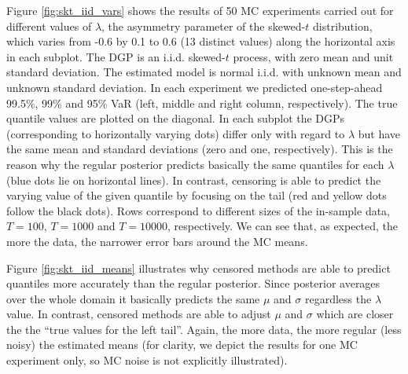 \documentclass[a4paper,10pt]{article} %
\begin{document}
Figure \ref{fig:skt_iid_vars}  shows the results of 50 MC experiments carried out for different values of $\lambda$, the asymmetry parameter of the skewed-$t$ distribution, which varies from -0.6 by 0.1 to 0.6 (13 distinct values) along the horizontal axis in each subplot. The DGP is an i.i.d. skewed-$t$  process, with zero mean and unit standard deviation. The estimated model is normal i.i.d. with unknown mean and unknown standard deviation.
In each experiment we predicted one-step-ahead 99.5\%, 99\% and 95\% VaR (left, middle and right column, respectively).
The true quantile values are plotted on the diagonal. 
In each subplot the DGPs (corresponding to horizontally varying dots) differ  only with regard to $\lambda$ but have the same mean and standard deviations (zero and one, respectively). This is the reason why the regular posterior predicts basically the same quantiles for each $\lambda$ (blue dots lie on horizontal lines). In contrast, censoring is able to predict the varying value of the given quantile by focusing on the tail (red and yellow dots follow the black dots). 
Rows correspond to different sizes of the in-sample data, $T=100$, $T=1000$ and $T=10000$, respectively. 
We can see that, as expected, the more the data, the narrower  error bars around the MC means. 

Figure \ref{fig:skt_iid_means} illustrates why censored methods are able to predict quantiles more accurately than the regular posterior. Since posterior averages over the whole domain it basically predicts the same $\mu$ and $\sigma$ regardless the $\lambda$ value. In contrast, censored methods are able to adjust $\mu$ and $\sigma$ which are closer the the ``true values for the left tail''. Again, the more data, the more regular (less noisy) the estimated means (for clarity, we depict the results for one MC experiment only, so MC noise is not explicitly illustrated). 
\end{document}
